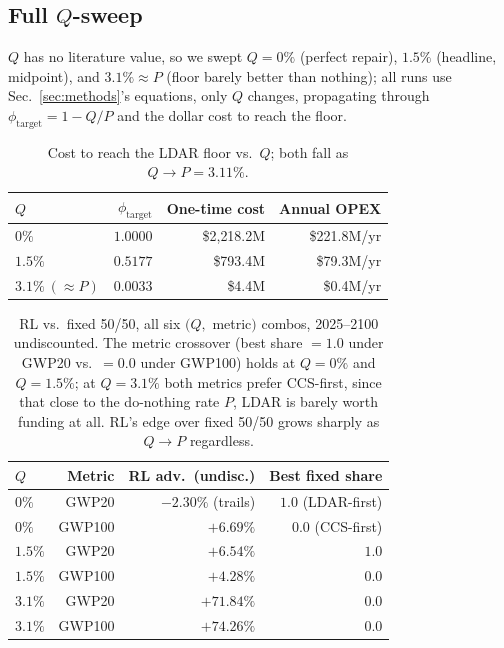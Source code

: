 \documentclass{article}
\begin{document}
{\subsection{Full $Q$-sweep}
\label{sec:app-qsweep}

$Q$ has no literature value, so we swept $Q=0\%$ (perfect repair),
$1.5\%$ (headline, midpoint), and $3.1\%\approx P$ (floor barely better
than nothing); all runs use Sec.~\ref{sec:methods}'s equations, only $Q$
changes, propagating through $\phi_{\text{target}}=1-Q/P$ and the dollar
cost to reach the floor.

\begin{table}[h]
  \caption{Cost to reach the LDAR floor vs.\ $Q$; both fall as $Q\to
  P=3.11\%$.}
  \label{tab:qsweep-cost}
  \centering
  \small
  \begin{tabular}{lrrr}
    \toprule
    $Q$ & $\phi_{\text{target}}$ & One-time cost & Annual OPEX \\
    \midrule
    $0\%$   & $1.0000$ & \$2{,}218.2M & \$221.8M/yr \\
    $1.5\%$ & $0.5177$ & \$793.4M     & \$79.3M/yr \\
    $3.1\%\ (\approx P)$ & $0.0033$ & \$4.4M & \$0.4M/yr \\
    \bottomrule
  \end{tabular}
\end{table}

\begin{table}[h]
  \caption{RL vs.\ fixed 50/50, all six $(Q,$ metric$)$ combos, 2025--2100
  undiscounted. The metric crossover (best share $=1.0$ under GWP20 vs.\
  $=0.0$ under GWP100) holds at $Q=0\%$ and $Q=1.5\%$; at $Q=3.1\%$ both
  metrics prefer CCS-first, since that close to the do-nothing rate $P$,
  LDAR is barely worth funding at all. RL's edge over fixed 50/50 grows
  sharply as $Q\to P$ regardless.}
  \label{tab:qsweep-adv}
  \centering
  \small
  \begin{tabular}{lrrr}
    \toprule
    $Q$ & Metric & RL adv.\ (undisc.) & Best fixed share \\
    \midrule
    $0\%$   & GWP20  & $-2.30\%$ (trails) & $1.0$ (LDAR-first) \\
    $0\%$   & GWP100 & $+6.69\%$             & $0.0$ (CCS-first) \\
    $1.5\%$ & GWP20  & $+6.54\%$             & $1.0$ \\
    $1.5\%$ & GWP100 & $+4.28\%$             & $0.0$ \\
    $3.1\%$ & GWP20  & $+71.84\%$            & $0.0$ \\
    $3.1\%$ & GWP100 & $+74.26\%$            & $0.0$ \\
    \bottomrule
  \end{tabular}
\end{table}

}
\end{document}
